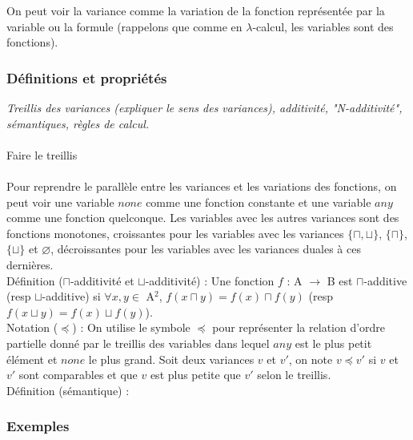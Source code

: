 \documentclass[11pt,a4paper]{article}
\begin{document}
On peut voir la variance comme la variation de la fonction représentée par la variable ou la formule (rappelons que comme en $\lambda$-calcul, les variables sont des fonctions). \color{black}  

\subsubsection{Définitions et propriétés}

\textit{Treillis des variances (expliquer le sens des variances), additivité, "N-additivité", sémantiques, règles de calcul.}
\\\\

Faire le treillis
\\\\

\color{red}
Pour reprendre le parallèle entre les variances et les variations des fonctions, on peut voir une variable $none$ comme une fonction constante et une variable $any$ comme une fonction quelconque. Les variables avec les autres variances sont des fonctions monotones, croissantes pour les variables avec les variances $\{\sqcap, \sqcup\}$, $\{\sqcap\}$, $\{\sqcup\}$ et $\varnothing$, décroissantes pour les variables avec les variances duales à ces dernières. 
\\

Définition ($\sqcap$-additivité et $\sqcup$-additivité) : Une fonction $f$ : A $\rightarrow$ B est $\sqcap$-additive (resp $\sqcup$-additive) si $\forall x, y \in$ A$^2$, $f(x \sqcap y) = f(x) \sqcap f(y)$ (resp $f(x \sqcup y) = f(x) \sqcup f(y)$).
\\

Notation ($\preccurlyeq$) : On utilise le symbole $\preccurlyeq$ pour représenter la relation d'ordre partielle donné par le treillis des variables dans lequel $any$ est le plus petit élément et $none$ le plus grand. Soit deux variances $v$ et $v'$, on note $v \preccurlyeq v'$ si $v$ et $v'$ sont comparables et que $v$ est plus petite que $v'$ selon le treillis. 
\\

Définition (sémantique) : 



\color{black}



\subsubsection{Exemples}
\end{document}
